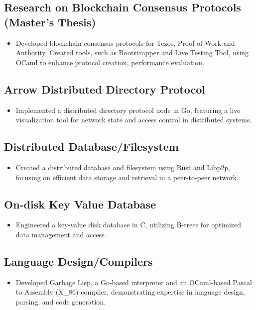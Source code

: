 \documentclass[a4paper, 12pt]{article}
\begin{document}
\subsection{Research on Blockchain Consensus Protocols (Master's Thesis)}
\begin{itemize}
  \item Developed blockchain consensus protocols for Tezos, Proof of Work and Authority. Created tools, such as Bootstrapper and Live Testing Tool, using OCaml to enhance protocol creation, performance evaluation.
\end{itemize}

\subsection{Arrow Distributed Directory Protocol}
\begin{itemize}
  \item Implemented a distributed directory protocol node in Go, featuring a live visualization tool for network state and access control in distributed systems.
\end{itemize}

\subsection{Distributed Database/Filesystem}
\begin{itemize}
  \item Created a distributed database and filesystem using Rust and Libp2p, focusing on efficient data storage and retrieval in a peer-to-peer network.
\end{itemize}

\subsection{On-disk Key Value Database}
\begin{itemize}
  \item Engineered a key-value disk database in C, utilizing B-trees for optimized data management and access.
\end{itemize}

\subsection{Language Design/Compilers}
\begin{itemize}
  \item Developed Garbage Lisp, a Go-based interpreter and an OCaml-based Pascal to Assembly (X\_86) compiler, demonstrating expertise in language design, parsing, and code generation.
\end{itemize}
\end{document}
